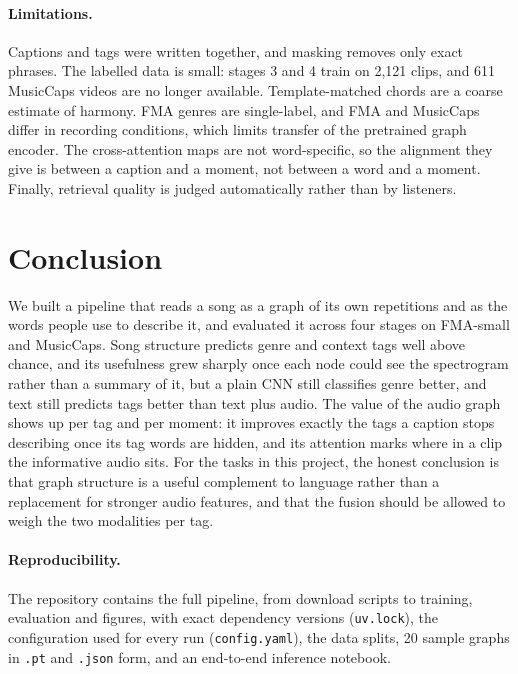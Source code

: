 \documentclass{article}
\begin{document}
\paragraph{Limitations.}
Captions and tags were written together, and masking removes only exact phrases. The labelled data is small: stages 3
and 4 train on 2,121 clips, and 611 MusicCaps videos are no longer available. Template-matched chords are a coarse
estimate of harmony. FMA genres are single-label, and FMA and MusicCaps differ in recording conditions, which limits
transfer of the pretrained graph encoder. The cross-attention maps are not word-specific, so the alignment they give
is between a caption and a moment, not between a word and a moment. Finally, retrieval quality is judged
automatically rather than by listeners.

\section{Conclusion}

We built a pipeline that reads a song as a graph of its own repetitions and as the words people use to describe it,
and evaluated it across four stages on FMA-small and MusicCaps. Song structure predicts genre and context tags well
above chance, and its usefulness grew sharply once each node could see the spectrogram rather than a summary of it,
but a plain CNN still classifies genre better, and text still predicts tags better than text plus audio. The value of
the audio graph shows up per tag and per moment: it improves exactly the tags a caption stops describing once its tag
words are hidden, and its attention marks where in a clip the informative audio sits. For the tasks in this project,
the honest conclusion is that graph structure is a useful complement to language rather than a replacement for
stronger audio features, and that the fusion should be allowed to weigh the two modalities per tag.

\paragraph{Reproducibility.}
The repository contains the full pipeline, from download scripts to training, evaluation and figures, with exact
dependency versions (\texttt{uv.lock}), the configuration used for every run (\texttt{config.yaml}), the data splits,
20 sample graphs in \texttt{.pt} and \texttt{.json} form, and an end-to-end inference notebook.



\end{document}
